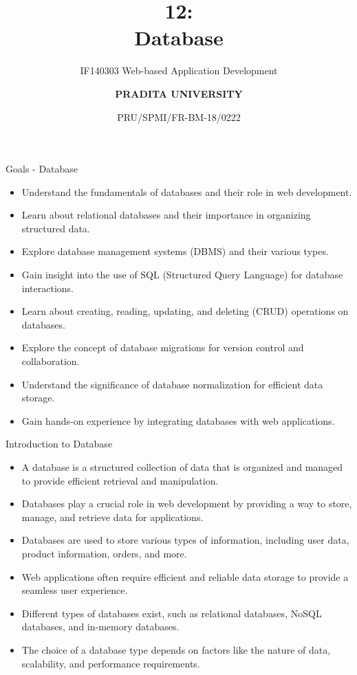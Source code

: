 \documentclass[aspectratio=169, table]{beamer}
\subtitle{IF140303 Web-based Application Development}
\title{\Huge {\textbf{12: \\Database}}}
\date[Serial]{\scriptsize {PRU/SPMI/FR-BM-18/0222}}
\author[Pradita]{\small {\textbf{PRADITA UNIVERSITY}}}
\begin{document}
\begin{frame}
    \titlepage
\end{frame}

\begin{frame}{Goals - Database}
    \vskip1cm
    \begin{itemize}
        \item Understand the fundamentals of databases and their role in web development.
        \item Learn about relational databases and their importance in organizing structured data.
        \item Explore database management systems (DBMS) and their various types.
        \item Gain insight into the use of SQL (Structured Query Language) for database interactions.
        \item Learn about creating, reading, updating, and deleting (CRUD) operations on databases.
        \item Explore the concept of database migrations for version control and collaboration.
        \item Understand the significance of database normalization for efficient data storage.
        \item Gain hands-on experience by integrating databases with web applications.
    \end{itemize}
\end{frame}

\begin{frame}{Introduction to Database}
    \vskip1cm
    \begin{itemize}
        \item A database is a structured collection of data that is organized and managed to provide efficient retrieval and manipulation.
        \item Databases play a crucial role in web development by providing a way to store, manage, and retrieve data for applications.
        \item Databases are used to store various types of information, including user data, product information, orders, and more.
        \item Web applications often require efficient and reliable data storage to provide a seamless user experience.
        \item Different types of databases exist, such as relational databases, NoSQL databases, and in-memory databases.
        \item The choice of a database type depends on factors like the nature of data, scalability, and performance requirements.
    \end{itemize}
\end{frame}
\end{document}
